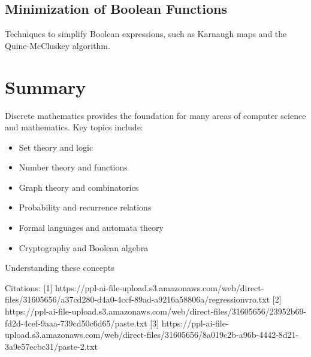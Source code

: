\documentclass{article}
\begin{document}
\subsection{Minimization of Boolean Functions}
Techniques to simplify Boolean expressions, such as Karnaugh maps and the Quine-McCluskey algorithm.

\section{Summary}

Discrete mathematics provides the foundation for many areas of computer science and mathematics. Key topics include:

\begin{itemize}
    \item Set theory and logic
    \item Number theory and functions
    \item Graph theory and combinatorics
    \item Probability and recurrence relations
    \item Formal languages and automata theory
    \item Cryptography and Boolean algebra
\end{itemize}

Understanding these concepts

Citations:
[1] https://ppl-ai-file-upload.s3.amazonaws.com/web/direct-files/31605656/a37cd280-d4a0-4ccf-89ad-a9216a58806a/regressionvro.txt
[2] https://ppl-ai-file-upload.s3.amazonaws.com/web/direct-files/31605656/23952b69-fd2d-4cef-9aaa-739cd50c6d65/paste.txt
[3] https://ppl-ai-file-upload.s3.amazonaws.com/web/direct-files/31605656/8a019c2b-a96b-4442-8d21-3a9e57ecbc31/paste-2.txt
\end{document}
